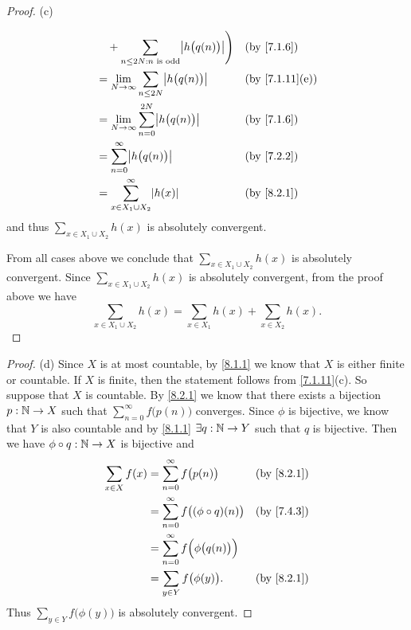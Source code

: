 \begin{proof}{(c)}
\begin{itemize}
\begin{align*}
			       & \quad + \sum_{n \leq 2N : n \text{ is odd}} \abs{h\big(q(n)\big)}\Bigg)                                             &  & \by{7.1.6}                   \\
			       & = \lim_{N \to \infty} \sum_{n \leq 2N} \abs{h\big(q(n)\big)}                                                        &  & \text{(by \cref{7.1.11}(e))} \\
			       & = \lim_{N \to \infty} \sum_{n = 0}^{2N} \abs{h\big(q(n)\big)}                                                       &  & \by{7.1.6}                   \\
			       & = \sum_{n = 0}^\infty \abs{h\big(q(n)\big)}                                                                         &  & \by{7.2.2}                   \\
			       & = \sum_{x \in X_1 \cup X_2}^\infty \abs{h(x)}                                                                       &  & \by{8.2.1}
		      \end{align*}
		      and thus \(\sum_{x \in X_1 \cup X_2} h(x)\) is absolutely convergent.
	\end{itemize}
	From all cases above we conclude that \(\sum_{x \in X_1 \cup X_2} h(x)\) is absolutely convergent.
	Since \(\sum_{x \in X_1 \cup X_2} h(x)\) is absolutely convergent, from the proof above we have
	\[
		\sum_{x \in X_1 \cup X_2} h(x) = \sum_{x \in X_1} h(x) + \sum_{x \in X_2} h(x).
	\]
\end{proof}

\begin{proof}{(d)}
	Since \(X\) is at most countable, by \cref{8.1.1} we know that \(X\) is either finite or countable.
	If \(X\) is finite, then the statement follows from \cref{7.1.11}(c).
	So suppose that \(X\) is countable.
	By \cref{8.2.1} we know that there exists a bijection \(p : \mathbb{N} \to X\) such that \(\sum_{n = 0}^\infty f\big(p(n)\big)\) converges.
	Since \(\phi\) is bijective, we know that \(Y\) is also countable and by \cref{8.1.1} \(\exists q : \mathbb{N} \to Y\) such that \(q\) is bijective.
	Then we have \(\phi \circ q : \mathbb{N} \to X\) is bijective and
	\begin{align*}
		\sum_{x \in X} f(x) & = \sum_{n = 0}^\infty f\big(p(n)\big)               &  & \by{8.2.1} \\
		                    & = \sum_{n = 0}^\infty f\big((\phi \circ q)(n)\big)  &  & \by{7.4.3} \\
		                    & = \sum_{n = 0}^\infty f\Big(\phi\big(q(n)\big)\Big)                 \\
		                    & = \sum_{y \in Y} f\big(\phi(y)\big).                &  & \by{8.2.1}
	\end{align*}
	Thus \(\sum_{y \in Y} f\big(\phi(y)\big)\) is absolutely convergent.
\end{proof}

